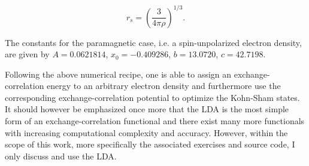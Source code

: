 \begin{equation}
	r_{s} = \left( \dfrac{3}{4 \pi \rho} \right)^{1/3}.
\end{equation}

The constants for the paramagnetic case, i.e. a spin-unpolarized electron density, are given by $A = 0.0621814$, $x_{0} = -0.409286$, $b = 13.0720$, $c = 42.7198$.

Following the above numerical recipe, one is able to assign an exchange-correlation energy to an arbitrary electron density and furthermore use the corresponding exchange-correlation potential to optimize the Kohn-Sham states. It should however be emphasized once more that the LDA is the most simple form of an exchange-correlation functional and there exist many more functionals with increasing computational complexity and accuracy. However, within the scope of this work, more specifically the associated exercises and source code, I only discuss and use the LDA.
